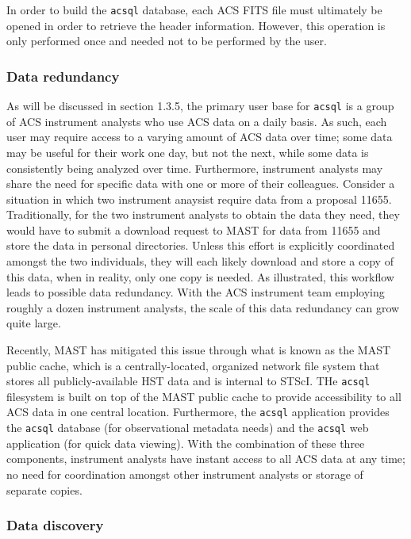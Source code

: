 \documentclass[10pt,journal,compsoc]{IEEEtran}
\begin{document}
In order to build the \texttt{acsql} database, each ACS FITS file must ultimately be
opened in order to retrieve the header information.  However, this operation is only
performed once and needed not to be performed by the user.

\subsubsection{Data redundancy}

As will be discussed in section 1.3.5, the primary user base for \texttt{acsql} is a group
of ACS instrument analysts who use ACS data on a daily basis.  As such, each user may
require access to a varying amount of ACS data over time; some data may be useful for
their work one day, but not the next, while some data is consistently being analyzed over
time.  Furthermore, instrument analysts may share the need for specific data with one or
more of their colleagues. Consider a situation in which two instrument anaysist require data
from a proposal 11655. Traditionally, for the two instrument analysts to obtain the data they
need, they would have to submit a download request to MAST for data from 11655 and store the data
in personal directories.  Unless this effort is explicitly coordinated amongst the two
individuals, they will each likely download and store a copy of this data, when in reality, only
one copy is needed.  As illustrated, this workflow leads to possible data redundancy.  With
the ACS instrument team employing roughly a dozen instrument analysts, the scale of this
data redundancy can grow quite large.

Recently, MAST has mitigated this issue through what is known as the MAST public cache, which is
a centrally-located, organized network file system that stores all publicly-available HST data and
is internal to STScI.  THe \texttt{acsql} filesystem is built on top of the MAST public cache
to provide accessibility to all ACS data in one central location.  Furthermore, the \texttt{acsql}
application provides the \texttt{acsql} database (for observational metadata needs) and the
\texttt{acsql} web application (for quick data viewing).  With the combination of these three
components, instrument analysts have instant access to all ACS data at any time; no need for
coordination amongst other instrument analysts or storage of separate copies.

\subsubsection{Data discovery}
\end{document}
